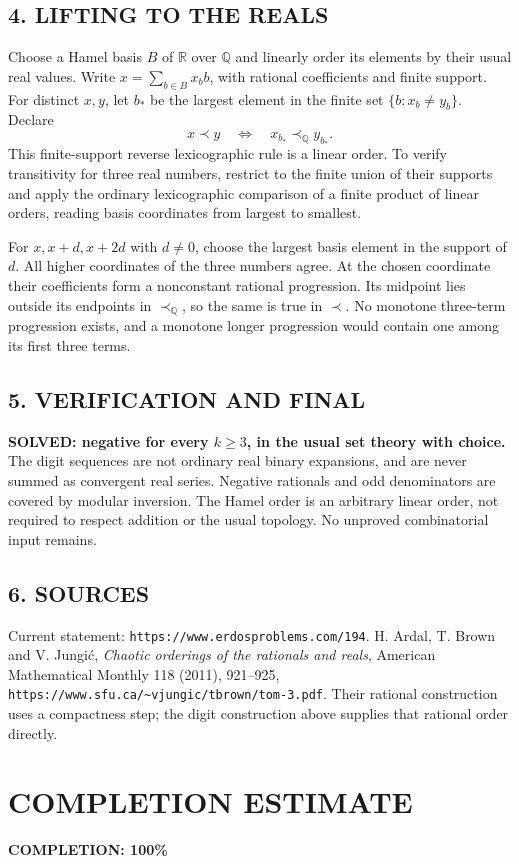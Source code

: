 \subsection*{4. LIFTING TO THE REALS}
Choose a Hamel basis $B$ of $\mathbb R$ over $\mathbb Q$ and linearly order its elements by their usual real values. Write $x=\sum_{b\in B}x_b b$, with rational coefficients and finite support. For distinct $x,y$, let $b_*$ be the largest element in the finite set $\{b:x_b\ne y_b\}$. Declare
\[
 x\prec y\quad\Longleftrightarrow\quad x_{b_*}\prec_{\mathbb Q}y_{b_*}.
\]
This finite-support reverse lexicographic rule is a linear order. To verify transitivity for three real numbers, restrict to the finite union of their supports and apply the ordinary lexicographic comparison of a finite product of linear orders, reading basis coordinates from largest to smallest.

For $x,x+d,x+2d$ with $d\ne0$, choose the largest basis element in the support of $d$. All higher coordinates of the three numbers agree. At the chosen coordinate their coefficients form a nonconstant rational progression. Its midpoint lies outside its endpoints in $\prec_{\mathbb Q}$, so the same is true in $\prec$. No monotone three-term progression exists, and a monotone longer progression would contain one among its first three terms.
\subsection*{5. VERIFICATION AND FINAL}
\textbf{SOLVED: negative for every $k\ge3$, in the usual set theory with choice.}
The digit sequences are not ordinary real binary expansions, and are never summed as convergent real series. Negative rationals and odd denominators are covered by modular inversion. The Hamel order is an arbitrary linear order, not required to respect addition or the usual topology. No unproved combinatorial input remains.
\subsection*{6. SOURCES}
Current statement: \texttt{https://www.erdosproblems.com/194}. H. Ardal, T. Brown and V. Jungi\'c, \emph{Chaotic orderings of the rationals and reals}, American Mathematical Monthly 118 (2011), 921--925, \texttt{https://www.sfu.ca/\~{}vjungic/tbrown/tom-3.pdf}. Their rational construction uses a compactness step; the digit construction above supplies that rational order directly.
\section{COMPLETION ESTIMATE}
\textbf{COMPLETION: 100\%}
